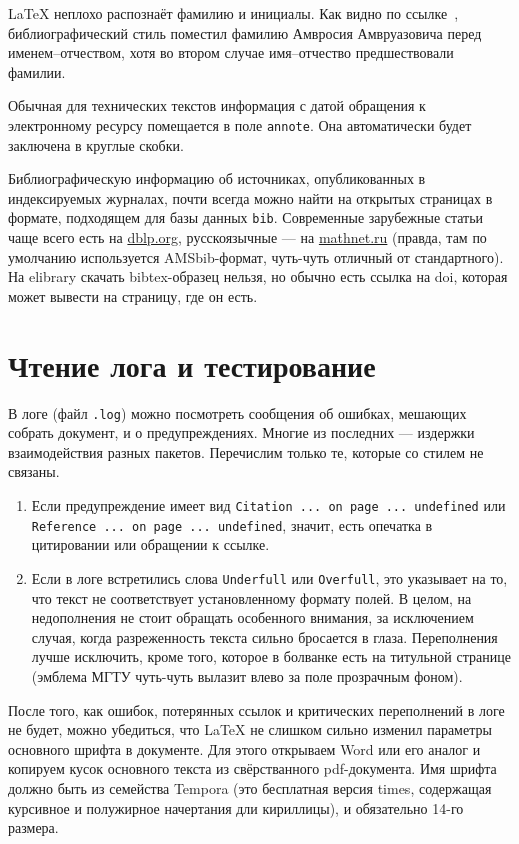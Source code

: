 \documentclass[14pt,russian]{scrartcl}
\begin{document}
\LaTeX{} неплохо распознаёт фамилию и инициалы. Как видно по ссылке~\cite{Vybegallo}, библиографический стиль поместил фамилию Амвросия Амвруазовича перед именем--отчеством, хотя во втором случае имя--отчество предшествовали фамилии. 

Обычная для технических текстов информация с датой обращения к электронному ресурсу помещается в поле \texttt{annote}. Она автоматически будет заключена в круглые скобки. 

Библиографическую информацию об источниках, опубликованных в индексируемых журналах, почти всегда можно найти на открытых страницах в формате, подходящем для базы данных \texttt{bib}. Современные зарубежные статьи чаще всего есть на \url{dblp.org}, русскоязычные --- на \url{mathnet.ru} (правда, там по умолчанию используется AMSbib-формат, чуть-чуть отличный от стандартного). На elibrary скачать bibtex-образец нельзя, но обычно есть ссылка на doi, которая может вывести на страницу, где он есть.

\section{Чтение лога и тестирование}

В логе (файл \texttt{.log}) можно посмотреть сообщения об ошибках, мешающих собрать документ, и о предупреждениях. Многие из последних --- издержки взаимодействия разных пакетов. Перечислим только те, которые со стилем не связаны.

\begin{enumerate}
\item Если предупреждение имеет вид \texttt{Citation ... on page ... undefined} или \texttt{Reference ... on page ... undefined}, значит, есть опечатка в цитировании или обращении к ссылке.
\item Если в логе встретились слова \texttt{Underfull} или \texttt{Overfull}, это указывает на то, что текст не соответствует установленному формату полей. В целом, на недополнения не стоит обращать особенного внимания, за исключением случая, когда разреженность текста сильно бросается в глаза. Переполнения лучше исключить, кроме того, которое в болванке есть на титульной странице (эмблема МГТУ чуть-чуть вылазит влево за поле прозрачным фоном).
\end{enumerate}

После того, как ошибок, потерянных ссылок и критических переполнений в логе не будет, можно убедиться, что \LaTeX{} не слишком сильно изменил параметры основного шрифта в документе. Для этого открываем Word или его аналог и копируем кусок основного текста из свёрстванного pdf-документа. Имя шрифта должно быть из семейства  Tempora (это бесплатная версия times, содержащая курсивное и полужирное начертания дли кириллицы), и обязательно 14-го размера.
\end{document}
